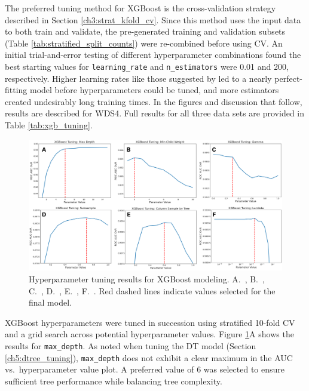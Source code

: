 The preferred tuning method for XGBoost is the cross-validation strategy described in Section \ref{ch3:strat_kfold_cv}. Since this method uses the input data to both train and validate, the pre-generated training and validation subsets (Table \ref{tab:stratified_split_counts}) were re-combined before using CV. An initial trial-and-error testing of different hyperparameter combinations found the best starting values for \verb|learning_rate| and \verb|n_estimators| were 0.01 and 200, respectively. Higher learning rates like those suggested by \citet{jain_xgboost_2016} led to a nearly perfect-fitting model before hyperparameters could be tuned, and more estimators created undesirably long training times. In the figures and discussion that follow, results are described for WDS4. Full results for all three data sets are provided in Table \ref{tab:xgb_tuning}.

\begin{figure}[!htp]
\centering
\includegraphics[width=\textwidth]{templates/images/Figure-XGB_Hyperparameters.png}
\caption[XGBoost hyperparameter tuning]{Hyperparameter tuning results for XGBoost modeling. A.\ , B.\ , C.\ , D.\ , E.\ , F.\ . Red dashed lines indicate values selected for the final model.}
\label{fig:xgb_hyperparam}
\end{figure}

XGBoost hyperparameters were tuned in succession using stratified 10-fold CV and a grid search across potential hyperparameter values. Figure \ref{fig:xgb_hyperparam}A shows the results for \verb|max_depth|. As noted when tuning the DT model (Section \ref{ch5:dtree_tuning}), \verb|max_depth| does not exhibit a clear maximum in the AUC vs.\ hyperparameter value plot. A preferred value of 6 was selected to ensure sufficient tree performance while balancing tree complexity.

